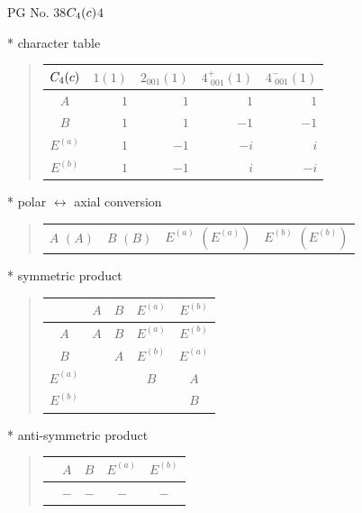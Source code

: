 \documentclass[fleqn,8pt,landscape]{jsarticle}
\begin{document}
\setcounter{MaxMatrixCols}{32}

\renewcommand{\tablename}{Table~}
\renewcommand{\figurename}{Figure~}
\begin{center}
\LARGE
PG No. 38\quad$C_{\rm 4}(c)$\quad$4$\quad[ tetragonal ]
\end{center}

* character table
\begin{quote}
\begin{tabular}{crrrr} \hline \hline
$ C_{\rm 4}(c) $ & $ 1(1) $ & $ 2{}_{001}(1) $ & $ 4^{+}_{\,\,001}(1) $ & $ 4^{-}_{\,\,001}(1) $ \\ \hline
$ A $ & $ 1 $ & $ 1 $ & $ 1 $ & $ 1 $ \\
$ B $ & $ 1 $ & $ 1 $ & $ -1 $ & $ -1 $ \\
$ E^{(a)} $ & $ 1 $ & $ -1 $ & $ - i $ & $ i $ \\
$ E^{(b)} $ & $ 1 $ & $ -1 $ & $ i $ & $ - i $ \\
 \hline \hline
\end{tabular}
\end{quote}

* polar $\leftrightarrow$ axial conversion
\begin{quote}
\begin{tabular}{cccc}
$ A\,\,(A) $ & $ B\,\,(B) $ & $ E^{(a)}\,\,(E^{(a)}) $ & $ E^{(b)}\,\,(E^{(b)}) $
\end{tabular}
\end{quote}

* symmetric product
\begin{quote}
\begin{tabular}{c|cccc} \hline \hline
 & $ A $ & $ B $ & $ E^{(a)} $ & $ E^{(b)} $ \\ \hline
$ A $ & $ A $ & $ B $ & $ E^{(a)} $ & $ E^{(b)} $ \\
$ B $ & $  $ & $ A $ & $ E^{(b)} $ & $ E^{(a)} $ \\
$ E^{(a)} $ & $  $ & $  $ & $ B $ & $ A $ \\
$ E^{(b)} $ & $  $ & $  $ & $  $ & $ B $ \\
 \hline \hline
\end{tabular}
\end{quote}

* anti-symmetric product
\begin{quote}
\begin{tabular}{ccccc} \hline \hline
 & $ A $ & $ B $ & $ E^{(a)} $ & $ E^{(b)} $ \\ \hline
$  $ & $ - $ & $ - $ & $ - $ & $ - $ \\
 \hline \hline
\end{tabular}
\end{quote}
\end{document}
